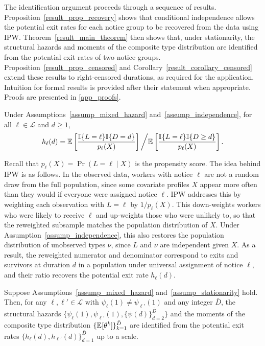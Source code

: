 \documentclass{div}
\begin{document}
The identification argument proceeds through a sequence of results. Proposition~\ref{result_prop_recovery} shows that conditional independence allows the potential exit rates for each notice group to be recovered from the data using IPW. Theorem~\ref{result_main_theorem} then shows that, under stationarity, the structural hazards and moments of the composite type distribution are identified from the potential exit rates of two notice groups. Proposition~\ref{result_prop_censored} and Corollary~\ref{result_corollary_censored} extend these results to right-censored durations, as required for the application. Intuition for formal results is provided after their statement when appropriate. Proofs are presented in \ref{app_proofs}.

\begin{prop}\label{result_prop_recovery}
Under Assumptions~\ref{assump_mixed_hazard} and~\ref{assump_independence}, for all $\ell \in \mathcal{L}$ and $d \geq 1$,
\begin{equation*}
h_{\ell}(d) =
\E\left[\frac{\I\{L=\ell\}\I\{D=d\}}{p_\ell(X)}\right] \bigg/
\E\left[\frac{\I\{L=\ell\}\I\{D \geq d\}}{p_\ell(X)}\right].
\end{equation*}
\end{prop}

Recall that $p_\ell(X) = \Pr(L=\ell \mid X)$ is the propensity score. The idea behind IPW is as follows. In the observed data, workers with notice $\ell$ are not a random draw from the full population, since some covariate profiles $X$ appear more often than they would if everyone were assigned notice $\ell$. IPW addresses this by weighting each observation with $L=\ell$ by $1/p_\ell(X)$. This down-weights workers who were likely to receive $\ell$ and up-weights those who were unlikely to, so that the reweighted subsample matches the population distribution of $X$. Under Assumption~\ref{assump_independence}, this also restores the population distribution of unobserved types $\nu$, since $L$ and $\nu$ are independent given $X$. As a result, the reweighted numerator and denominator correspond to exits and survivors at duration $d$ in a population under universal assignment of notice $\ell$, and their ratio recovers the potential exit rate $h_\ell(d)$.

\begin{theorem}\label{result_main_theorem}
Suppose Assumptions~\ref{assump_mixed_hazard} and~\ref{assump_stationarity} hold. Then, for any $\ell, \ell' \in \mathcal{L}$ with $\psi_{\ell}(1) \neq \psi_{\ell'}(1)$ and any integer $\bar{D}$, the structural hazards $\{\psi_{\ell}(1), \psi_{\ell'}(1), \{\psi(d)\}_{d=2}^{\bar{D}}\}$ and the moments of the composite type distribution $\{\E[\theta^k]\}_{k=1}^{\bar{D}}$ are identified from the potential exit rates $\{h_{\ell}(d), h_{\ell'}(d)\}_{d=1}^{\bar{D}}$ up to a scale.
\end{theorem}
\end{document}
